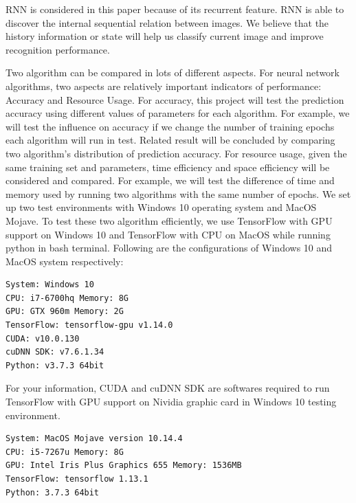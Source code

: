 \documentclass[letterpaper]{article} %
\begin{document}
RNN is considered in this paper because of its recurrent feature. RNN is able to discover the internal sequential relation between images. We believe that the history information or state will help us classify current image and improve recognition performance.

Two algorithm can be compared in lots of different aspects. For neural network algorithms, two aspects are relatively important indicators of performance: Accuracy and Resource Usage. For accuracy, this project will test the prediction accuracy using different values of parameters for each algorithm. For example, we will test the influence on accuracy if we change the number of training epochs each algorithm will run in test. Related result will be concluded by comparing two algorithm’s distribution of prediction accuracy. For resource usage, given the same training set and parameters, time efficiency and space efficiency will be considered and compared. For example, we will test the difference of time and memory used by running two algorithms with the same number of epochs.
We set up two test environments with Windows 10 operating system and MacOS Mojave. To test these two algorithm efficiently, we use TensorFlow with GPU support on Windows 10 and TensorFlow with CPU on MacOS while running python in bash terminal. Following are the configurations of Windows 10 and MacOS system respectively:
\begin{lstlisting}[columns=fullflexible, keepspaces=true, stepnumber=1]
System: Windows 10
CPU: i7-6700hq Memory: 8G
GPU: GTX 960m Memory: 2G
TensorFlow: tensorflow-gpu v1.14.0
CUDA: v10.0.130
cuDNN SDK: v7.6.1.34
Python: v3.7.3 64bit
\end{lstlisting}
For your information, CUDA and cuDNN SDK are softwares required to run TensorFlow with GPU support on Nividia graphic card in Windows 10 testing environment.
\begin{lstlisting}[columns=fullflexible, keepspaces=true, stepnumber=1]
System: MacOS Mojave version 10.14.4
CPU: i5-7267u Memory: 8G
GPU: Intel Iris Plus Graphics 655 Memory: 1536MB
TensorFlow: tensorflow 1.13.1
Python: 3.7.3 64bit
\end{lstlisting}



\newpage


\end{document}

